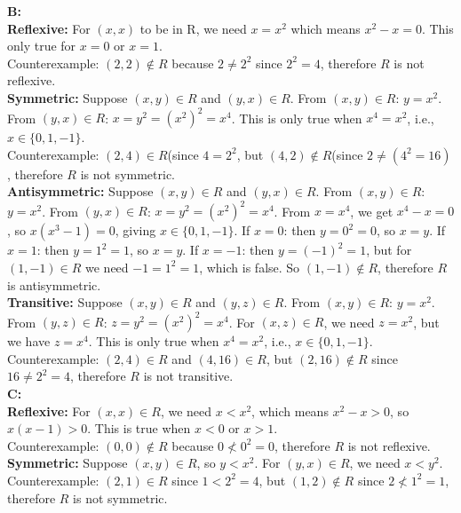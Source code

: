 \documentclass[10pt]{exam}
\begin{document}
\begin{questions}
\begin{solution}
    \textbf{B:}\\
    \textbf{Reflexive:} For $(x,x)$ to be in R, we need $x = x^2$ which means $x^2 -x = 0$. This only true for $x = 0$ or $x = 1$.\\
    Counterexample: $(2,2) \notin R$ because $2 \neq 2^2$ since $2^2 = 4$, therefore $R$ is not reflexive.\\
    \textbf{Symmetric:} Suppose $(x,y) \in R$ and $(y,x) \in R$. From $(x,y) \in R$: $y = x^2$. From $(y,x) \in R$: $x = y^2 = (x^2)^2 = x^4$. This is only true when $x^4 = x^2$, i.e., $x \in \{0, 1, -1\}$.\\
    Counterexample: $(2,4) \in R$(since $4 = 2^2$, but $(4,2) \notin R$(since $2 \neq (4^2 = 16)$, therefore $R$ is not symmetric.\\
    \textbf{Antisymmetric:} Suppose $(x,y) \in R$ and $(y,x) \in R$. From $(x,y) \in R$: $y = x^2$. From $(y,x) \in R$: $x = y^2 = (x^2)^2 = x^4$.
    From $x = x^4$, we get $x^4 - x = 0$, so $x(x^3 - 1) = 0$, giving $x \in \{0, 1, -1\}$.
    If $x = 0$: then $y = 0^2 = 0$, so $x = y$. If $x = 1$: then $y = 1^2 = 1$, so $x = y$. If $x = -1$: then $y = (-1)^2 = 1$, but for $(1,-1) \in R$ we need $-1 = 1^2 = 1$, which is false. So $(1,-1) \notin R$, therefore $R$ is antisymmetric.\\
    \textbf{Transitive:} Suppose $(x,y) \in R$ and $(y,z) \in R$. From $(x,y) \in R$: $y = x^2$. From $(y,z) \in R$: $z = y^2 = (x^2)^2 = x^4$.
    For $(x,z) \in R$, we need $z = x^2$, but we have $z = x^4$. This is only true when $x^4 = x^2$, i.e., $x \in \{0, 1, -1\}$.\\
    Counterexample: $(2,4) \in R$ and $(4,16) \in R$, but $(2,16) \notin R$ since $16 \neq 2^2 = 4$, therefore $R$ is not transitive.\\
    
    \textbf{C:}\\
    \textbf{Reflexive:} For $(x,x) \in R$, we need $x < x^2$, which means $x^2 - x > 0$, so $x(x-1) > 0$.
    This is true when $x < 0$ or $x > 1$.\\
    Counterexample: $(0,0) \notin R$ because $0 \not< 0^2 = 0$, therefore $R$ is not reflexive.\\
    
    \textbf{Symmetric:} Suppose $(x,y) \in R$, so $y < x^2$.
    For $(y,x) \in R$, we need $x < y^2$.\\
    Counterexample: $(2,1) \in R$ since $1 < 2^2 = 4$, but $(1,2) \notin R$ since $2 \not< 1^2 = 1$, therefore $R$ is not symmetric.\\
    

\end{solution}
\end{questions}
\end{document}
